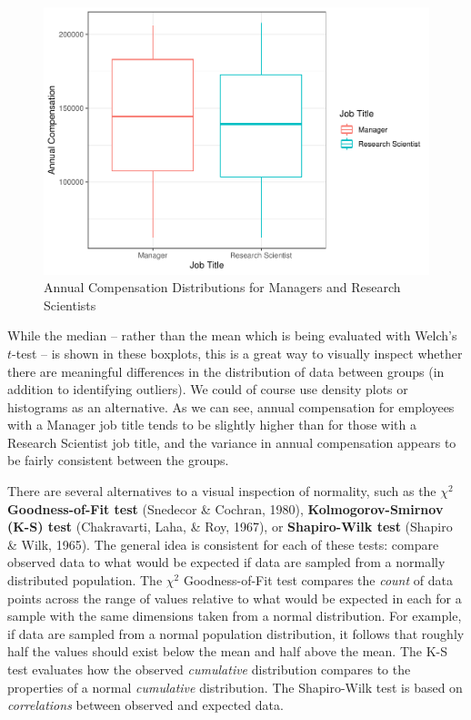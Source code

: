 \documentclass[]{book}
\begin{document}
\begin{figure}

{\centering \includegraphics[width=1\linewidth]{The_People_Analytics_Companion_files/figure-latex/comp-job-boxplots-1} 

}

\caption{Annual Compensation Distributions for Managers and Research Scientists}\label{fig:comp-job-boxplots}
\end{figure}

While the median -- rather than the mean which is being evaluated with Welch's \(t\)-test -- is shown in these boxplots, this is a great way to visually inspect whether there are meaningful differences in the distribution of data between groups (in addition to identifying outliers). We could of course use density plots or histograms as an alternative. As we can see, annual compensation for employees with a Manager job title tends to be slightly higher than for those with a Research Scientist job title, and the variance in annual compensation appears to be fairly consistent between the groups.

There are several alternatives to a visual inspection of normality, such as the \({\chi}^2\) \textbf{Goodness-of-Fit test} (Snedecor \& Cochran, 1980), \textbf{Kolmogorov-Smirnov (K-S) test} (Chakravarti, Laha, \& Roy, 1967), or \textbf{Shapiro-Wilk test} (Shapiro \& Wilk, 1965). The general idea is consistent for each of these tests: compare observed data to what would be expected if data are sampled from a normally distributed population. The \({\chi}^2\) Goodness-of-Fit test compares the \emph{count} of data points across the range of values relative to what would be expected in each for a sample with the same dimensions taken from a normal distribution. For example, if data are sampled from a normal population distribution, it follows that roughly half the values should exist below the mean and half above the mean. The K-S test evaluates how the observed \emph{cumulative} distribution compares to the properties of a normal \emph{cumulative} distribution. The Shapiro-Wilk test is based on \emph{correlations} between observed and expected data.
\end{document}
